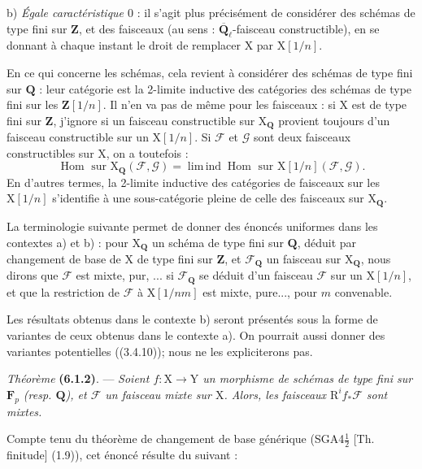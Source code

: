 \documentclass[11pt,leqno]{article}
\begin{document}
b) \textit{Égale caractéristique \(0\)} : il s’agit plus précisément
de considérer des schémas de type fini sur \(\mathbf{Z}\), et des
faisceaux (au sens : \(\overline{\mathbf{Q}}_\ell\)-faisceau
constructible), en se donnant à chaque instant le droit de remplacer
\(\mathrm{X}\) par \(\mathrm{X}[1/n]\).

En ce qui concerne les schémas, cela revient à considérer des schémas
de type fini sur \(\mathbf{Q}\) : leur catégorie est la 2-limite
inductive des catégories des schémas de type fini sur les
\(\mathbf{Z}[1/n]\). Il n’en va pas de même pour les faisceaux :
si \(\mathrm{X}\) est de type fini sur \(\mathbf{Z}\), j’ignore si un
faisceau constructible sur \(\mathrm{X}_{\mathbf{Q}}\) provient toujours
d’un faisceau constructible sur un \(\mathrm{X}[1/n]\). Si
\(\mathscr{F}\) et \(\mathscr{G}\) sont deux faisceaux constructibles
sur \(\mathrm{X}\), on a toutefois :
\[
\operatorname{Hom}\text{ sur }\mathrm{X}_{\mathbf{Q}}(\mathscr{F},\mathscr{G})
=\operatorname{lim\,ind}\operatorname{Hom}\text{ sur }
\mathrm{X}[1/n](\mathscr{F},\mathscr{G}).
\]
En d’autres termes, la 2-limite inductive des catégories de faisceaux
sur les \(\mathrm{X}[1/n]\) s’identifie à une sous-catégorie pleine
de celle des faisceaux sur \(\mathrm{X}_{\mathbf{Q}}\).

La terminologie suivante permet de donner des énoncés uniformes dans
les contextes a) et b) : pour \(\mathrm{X}_{\mathbf{Q}}\) un schéma
de type fini sur \(\mathbf{Q}\), déduit par changement de base de
\(\mathrm{X}\) de type fini sur \(\mathbf{Z}\), et
\(\mathscr{F}_{\mathbf{Q}}\) un faisceau sur \(\mathrm{X}_{\mathbf{Q}}\),
nous dirons que \(\mathscr{F}\) est mixte, pur, ... si
\(\mathscr{F}_{\mathbf{Q}}\) se déduit d’un faisceau \(\mathscr{F}\)
sur un \(\mathrm{X}[1/n]\), et que la restriction de \(\mathscr{F}\)
à \(\mathrm{X}[1/nm]\) est mixte, pure..., pour \(m\) convenable.

Les résultats obtenus dans le contexte b) seront présentés sous la
forme de variantes de ceux obtenus dans le contexte a). On pourrait
aussi donner des variantes potentielles ((3.4.10)); nous ne les
expliciterons pas.

\textit{Théorème} \textbf{(6.1.2)}. — \textit{Soient
\(f:\mathrm{X}\to\mathrm{Y}\) un morphisme de schémas de type fini
sur \(\mathbf{F}_p\) (resp. \(\mathbf{Q}\)), et \(\mathscr{F}\) un
faisceau mixte sur \(\mathrm{X}\). Alors, les faisceaux
\(\mathrm{R}^if_*\mathscr{F}\) sont mixtes.}

Compte tenu du théorème de changement de base générique
(SGA4\(\frac{1}{2}\) [Th. finitude] (1.9)), cet énoncé résulte du
suivant :
\end{document}
